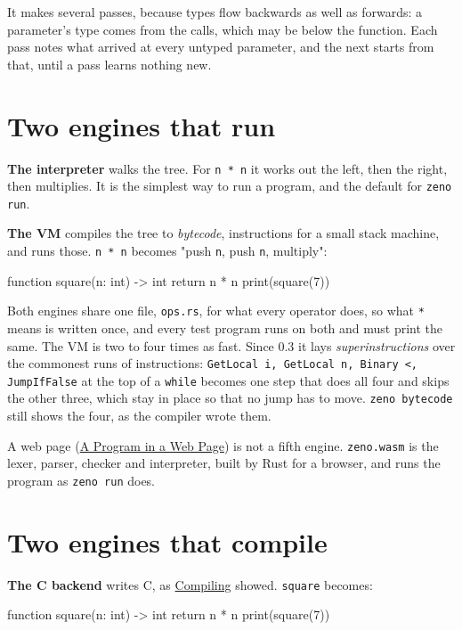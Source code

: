 It makes several passes, because types flow backwards as well as
forwards: a parameter's type comes from the calls, which may be below
the function. Each pass notes what arrived at every untyped parameter,
and the next starts from that, until a pass learns nothing new.

\section{Two engines that run}

\textbf{The interpreter} walks the tree. For \verb|n * n| it works out
the left, then the right, then multiplies. It is the simplest way to
run a program, and the default for \verb|zeno run|.

\textbf{The VM} compiles the tree to \emph{bytecode}, instructions for
a small stack machine, and runs those. \verb|n * n| becomes "push
\verb|n|, push \verb|n|, multiply":

\begin{zeno}[file=square.zeno, dir=sq, show=no, cmd=zeno bytecode {file}]
function square(n: int) -> int {
    return n * n
}
print(square(7))
\end{zeno}

Both engines share one file, \verb|ops.rs|, for what every operator
does, so what \verb|*| means is written once, and every test program
runs on both and must print the same. The VM is two to four times as
fast. Since 0.3 it lays \emph{superinstructions} over the commonest
runs of instructions: \verb|GetLocal i, GetLocal n, Binary <,|
\verb|JumpIfFalse| at the top of a \verb|while| becomes one step that
does all four and skips the other three, which stay in place so that
no jump has to move. \verb|zeno bytecode| still shows the four, as the
compiler wrote them.

A web page (\hyperref[ch-web]{A Program in a Web Page}) is not a fifth
engine. \verb|zeno.wasm| is the lexer, parser, checker and
interpreter, built by Rust for a browser, and runs the program as
\verb|zeno run| does.

\section{Two engines that compile}

\textbf{The C backend} writes C, as \hyperref[ch-compiling]{Compiling}
showed. \verb|square| becomes:

\begin{zeno}[file=square.zeno, dir=sq, show=no, cmd=zeno build {file} > /dev/null ;; grep -A3 "^static int64_t z_square(int64_t z_n) {" square.c]
function square(n: int) -> int {
    return n * n
}
print(square(7))
\end{zeno}

